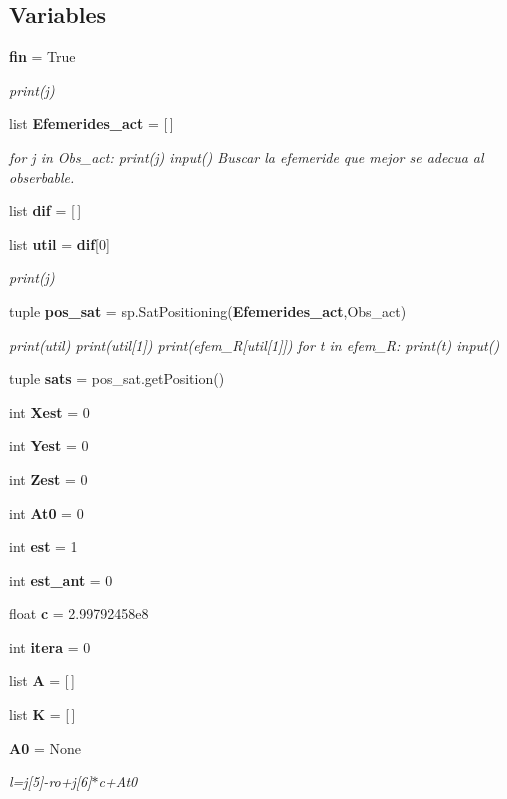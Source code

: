 \subsection*{Variables}
\begin{DoxyCompactItemize}
\item 
{\bf fin} = True
\begin{DoxyCompactList}\small\item\em print(j) \end{DoxyCompactList}\item 
list {\bf Efemerides\-\_\-act} = [$\,$]
\begin{DoxyCompactList}\small\item\em for j in Obs\-\_\-act\-: print(j) input() Buscar la efemeride que mejor se adecua al obserbable. \end{DoxyCompactList}\item 
list {\bf dif} = [$\,$]
\item 
list {\bf util} = {\bf dif}[0]
\begin{DoxyCompactList}\small\item\em print(j) \end{DoxyCompactList}\item 
tuple {\bf pos\-\_\-sat} = sp.\-Sat\-Positioning({\bf Efemerides\-\_\-act},Obs\-\_\-act)
\begin{DoxyCompactList}\small\item\em print(util) print(util[1]) print(efem\-\_\-\-R[util[1]]) for t in efem\-\_\-\-R\-: print(t) input() \end{DoxyCompactList}\item 
tuple {\bf sats} = pos\-\_\-sat.\-get\-Position()
\item 
int {\bf Xest} = 0
\item 
int {\bf Yest} = 0
\item 
int {\bf Zest} = 0
\item 
int {\bf At0} = 0
\item 
int {\bf est} = 1
\item 
int {\bf est\-\_\-ant} = 0
\item 
float {\bf c} = 2.\-99792458e8
\item 
int {\bf itera} = 0
\item 
list {\bf A} = [$\,$]
\item 
list {\bf K} = [$\,$]
\item 
{\bf A0} = None
\begin{DoxyCompactList}\small\item\em l=j[5]-\/ro+j[6]$\ast$c+\-At0 \end{DoxyCompactList}\item 

\end{DoxyCompactItemize}
